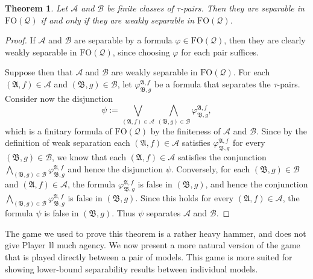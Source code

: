 \documentclass{article}
\newtheorem{theorem}{Theorem}[section]
\theoremstyle{definition}
\begin{document}
\begin{theorem}\label{thm:weak-strong-equivalence}
    Let $\mathcal{A}$ and $\mathcal{B}$ be finite classes of $\tau$-pairs. Then they are separable in $\mathrm{FO}(\mathcal{Q})$ if and only if they are weakly separable in $\mathrm{FO}(\mathcal{Q})$.
\end{theorem}
\begin{proof}
    If $\mathcal{A}$ and $\mathcal{B}$ are separable by a formula $\varphi\in\mathrm{FO}(\mathcal{Q})$, then they are clearly weakly separable in $\mathrm{FO}(\mathcal{Q})$, since choosing $\varphi$ for each pair suffices.
    
    Suppose then that $\mathcal{A}$ and $\mathcal{B}$ are weakly separable in $\mathrm{FO}(\mathcal{Q})$. For each $(\mathfrak{A},f)\in \mathcal{A}$ and $(\mathfrak{B},g)\in\mathcal{B}$, let $\varphi^{\mathfrak{A},f}_{\mathfrak{B},g}$ be a formula that separates the $\tau$-pairs. Consider now the disjunction
    \[
        \psi:=\bigvee_{(\mathfrak{A},f)\in \mathcal{A}}\bigwedge_{(\mathfrak{B},g)\in\mathcal{B}}\varphi^{\mathfrak{A},f}_{\mathfrak{B},g},
    \]
    which is a finitary formula of $\mathrm{FO}(\mathcal{Q})$ by the finiteness of $\mathcal{A}$ and $\mathcal{B}$. Since by the definition of weak separation each $(\mathfrak{A},f)\in\mathcal{A}$ satisfies $\varphi^{\mathfrak{A},f}_{\mathfrak{B},g}$ for every $(\mathfrak{B},g)\in\mathcal{B}$, we know that each $(\mathfrak{A},f)\in\mathcal{A}$ satisfies the conjunction $\bigwedge_{(\mathfrak{B},g) \in \mathcal{B}}\varphi^{\mathfrak{A},f}_{\mathfrak{B},g}$ and hence the disjunction $\psi$. Conversely, for each $(\mathfrak{B},g)\in\mathcal{B}$ and $(\mathfrak{A},f)\in\mathcal{A}$, the formula $\varphi^{\mathfrak{A},f}_{\mathfrak{B},g}$ is false in $(\mathfrak{B},g)$, and hence the conjunction $\bigwedge_{(\mathfrak{B},g) \in \mathcal{B}}\varphi^{\mathfrak{A},f}_{\mathfrak{B},g}$ is false in $(\mathfrak{B},g)$. Since this holds for every $(\mathfrak{A},f)\in\mathcal{A}$, the formula $\psi$ is false in $(\mathfrak{B},g)$. Thus $\psi$ separates $\mathcal{A}$ and $\mathcal{B}$.
\end{proof}

The game we used to prove this theorem is a rather heavy hammer, and does not give Player $\mathbb{II}$ much agency. We now present a more natural version of the game that is played directly between a pair of models. This game is more suited for showing lower-bound separability results between individual models.
\end{document}
